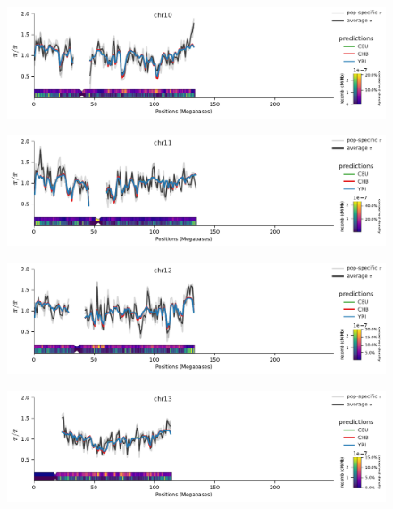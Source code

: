 \documentclass[11pt]{article}
\begin{document}
\begin{figure}[!htb]
  \centering
  \includegraphics[width=\textwidth]{figures/supplementary/pred_plot_chr10.pdf}
  \label{suppfig:fit-chr10}
\end{figure}


\begin{figure}[!htb]
  \centering
  \includegraphics[width=\textwidth]{figures/supplementary/pred_plot_chr11.pdf}
  \label{suppfig:fit-chr11}
\end{figure}


\begin{figure}[!htb]
  \centering
  \includegraphics[width=\textwidth]{figures/supplementary/pred_plot_chr12.pdf}
  \label{suppfig:fit-chr12}
\end{figure}


\begin{figure}[!htb]
  \centering
  \includegraphics[width=\textwidth]{figures/supplementary/pred_plot_chr13.pdf}
  \label{suppfig:fit-chr13}
\end{figure}
\end{document}
